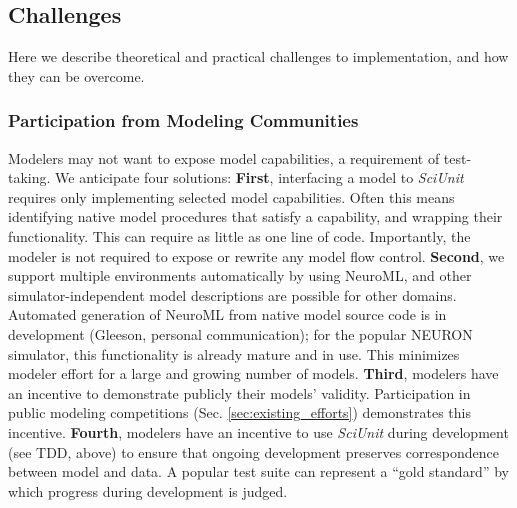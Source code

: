 \documentclass[11pt,letterpaper]{article}
\begin{document}
\subsection{Challenges}
Here we describe theoretical and practical challenges to implementation, and how they can be overcome.

\subsubsection{Participation from Modeling Communities}
Modelers may not want to expose model capabilities, a requirement of test-taking.  We anticipate four solutions: \textbf{First}, interfacing a model to \textit{SciUnit} requires only implementing selected model capabilities.  Often this means identifying native model procedures that satisfy a capability, and wrapping their functionality.  This can require as little as one line of code.  Importantly, the modeler is not required to expose or rewrite any model flow control.  \textbf{Second}, we support multiple environments automatically by using NeuroML\cite{gleeson_neuroml:_2010}, and other simulator-independent model descriptions are possible for other domains. Automated generation of NeuroML from native model source code is in development (Gleeson, personal communication); for the popular NEURON simulator\cite{neuron_url}, this functionality is already mature and in use.  This minimizes modeler effort for a large and growing number of models.  \textbf{Third}, modelers have an incentive to demonstrate publicly their models' validity.  Participation in public modeling competitions (Sec. \ref{sec:existing_efforts}) demonstrates this incentive.  \textbf{Fourth}, modelers have an incentive to use \textit{SciUnit} during development (see TDD, above) to ensure that ongoing development preserves correspondence between model and data.  A popular test suite can represent a ``gold standard'' by which progress during development is judged.
\end{document}
